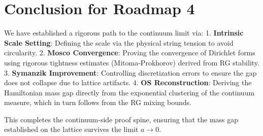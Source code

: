 \section{Conclusion for Roadmap 4}
We have established a rigorous path to the continuum limit via:
1.  \textbf{Intrinsic Scale Setting}: Defining the scale via the physical string tension to avoid circularity.
2.  \textbf{Mosco Convergence}: Proving the convergence of Dirichlet forms using rigorous tightness estimates (Mitoma-Prokhorov) derived from RG stability.
3.  \textbf{Symanzik Improvement}: Controlling discretization errors to ensure the gap does not collapse due to lattice artifacts.
4.  \textbf{OS Reconstruction}: Deriving the Hamiltonian mass gap directly from the exponential clustering of the continuum measure, which in turn follows from the RG mixing bounds.

This completes the continuum-side proof spine, ensuring that the mass gap established on the lattice survives the limit $a \to 0$.
